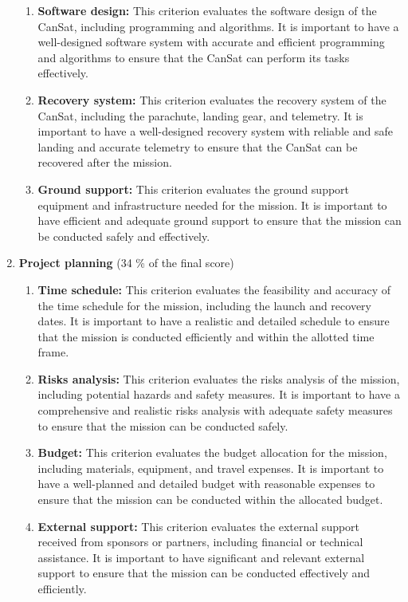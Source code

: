 \documentclass[11pt]{article}
\begin{document}
\begin{enumerate}
\begin{enumerate}
        \item {\textbf{Software design:}} This criterion evaluates the software design of the CanSat, including programming and algorithms. It is important to have a well-designed software system with accurate and efficient programming and algorithms to ensure that the CanSat can perform its tasks effectively.

        \item {\textbf{Recovery system:}} This criterion evaluates the recovery system of the CanSat, including the parachute, landing gear, and telemetry. It is important to have a well-designed recovery system with reliable and safe landing and accurate telemetry to ensure that the CanSat can be recovered after the mission.

        \item {\textbf{Ground support:}} This criterion evaluates the ground support equipment and infrastructure needed for the mission. It is important to have efficient and adequate ground support to ensure that the mission can be conducted safely and effectively.
    \end{enumerate}

    \item {\textbf{Project planning} (34 \% of the final score)}
    \begin{enumerate}
        \item {\textbf{Time schedule:}} This criterion evaluates the feasibility and accuracy of the time schedule for the mission, including the launch and recovery dates. It is important to have a realistic and detailed schedule to ensure that the mission is conducted efficiently and within the allotted time frame.
        
        \item {\textbf{Risks analysis:}} This criterion evaluates the risks analysis of the mission, including potential hazards and safety measures. It is important to have a comprehensive and realistic risks analysis with adequate safety measures to ensure that the mission can be conducted safely.
        
        \item {\textbf{Budget:}} This criterion evaluates the budget allocation for the mission, including materials, equipment, and travel expenses. It is important to have a well-planned and detailed budget with reasonable expenses to ensure that the mission can be conducted within the allocated budget.
        
        \item {\textbf{External support:}} This criterion evaluates the external support received from sponsors or partners, including financial or technical assistance. It is important to have significant and relevant external support to ensure that the mission can be conducted effectively and efficiently.
        

\end{enumerate}
\end{enumerate}
\end{document}
